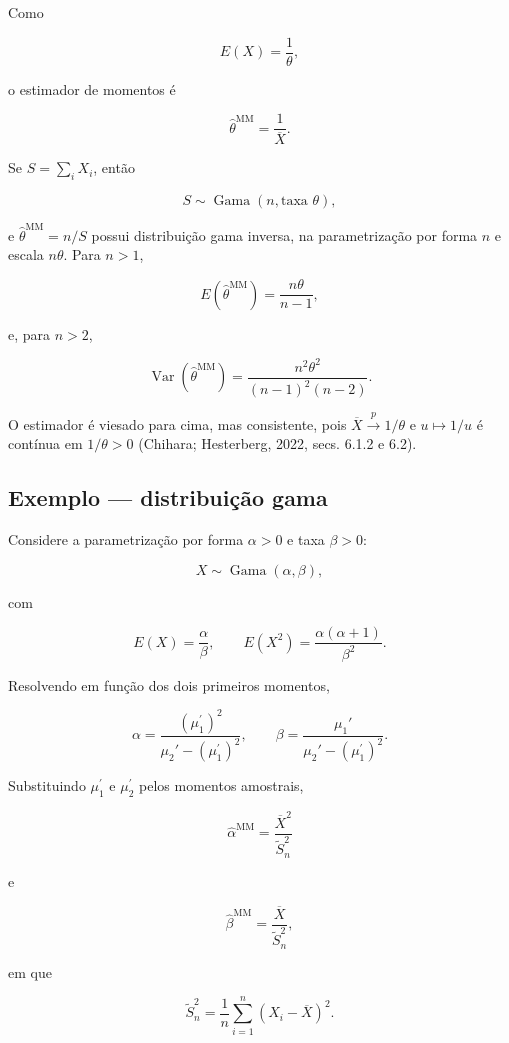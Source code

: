 \documentclass[
  letterpaper,
  DIV=11,
  numbers=noendperiod]{scrreprt}
\begin{document}
Como

\[E(X)=\frac{1}{\theta},\]

o estimador de momentos é

\[\boxed{
\widehat\theta^{\mathrm{MM}}=\frac{1}{\overline X}
}.\]

Se \(S=\sum_iX_i\), então

\[S\sim\operatorname{Gama}(n,\text{taxa }\theta),\]

e \(\widehat\theta^{\mathrm{MM}}=n/S\) possui distribuição gama inversa,
na parametrização por forma \(n\) e escala \(n\theta\). Para \(n>1\),

\[E(\widehat\theta^{\mathrm{MM}})
=\frac{n\theta}{n-1},\]

e, para \(n>2\),

\[\operatorname{Var}(\widehat\theta^{\mathrm{MM}})
=\frac{n^2\theta^2}{(n-1)^2(n-2)}.\]

O estimador é viesado para cima, mas consistente, pois
\(\overline X\xrightarrow{p}1/\theta\) e \(u\mapsto1/u\) é contínua em
\(1/\theta>0\) (Chihara; Hesterberg, 2022, secs. 6.1.2 e 6.2).

\subsection*{Exemplo --- distribuição
gama}\label{exemplo-distribuiuxe7uxe3o-gama}

Considere a parametrização por forma \(\alpha>0\) e taxa \(\beta>0\):

\[X\sim\operatorname{Gama}(\alpha,\beta),\]

com

\[E(X)=\frac{\alpha}{\beta},
\qquad
E(X^2)=\frac{\alpha(\alpha+1)}{\beta^2}.\]

Resolvendo em função dos dois primeiros momentos,

\[\alpha=\frac{(\mu_1^{\prime})^2}{\mu_2'-(\mu_1^{\prime})^2},
\qquad
\beta=\frac{\mu_1'}{\mu_2'-(\mu_1^{\prime})^2}.\]

Substituindo \(\mu_1^{\prime}\) e \(\mu_2^{\prime}\) pelos momentos
amostrais,

\[\boxed{
\widehat\alpha^{\mathrm{MM}}
=\frac{\overline X^2}{\widetilde S_n^2}
}\]

e

\[\boxed{
\widehat\beta^{\mathrm{MM}}
=\frac{\overline X}{\widetilde S_n^2}
},\]

em que

\[\widetilde S_n^2
=\frac{1}{n}\sum_{i=1}^n(X_i-\overline X)^2.\]
\end{document}
